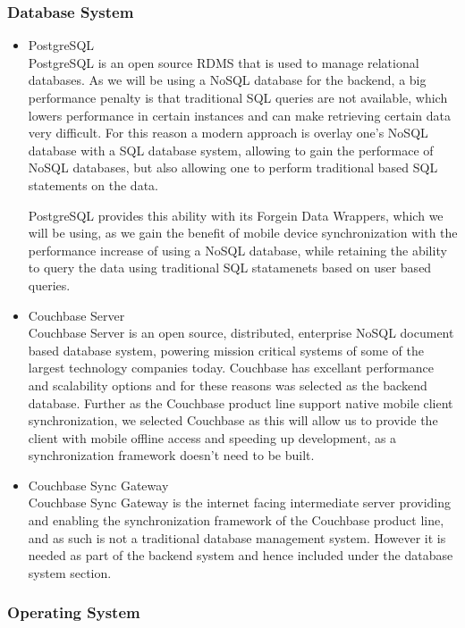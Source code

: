 \documentclass[a4paper,10pt]{article}
\begin{document}
\subsubsection{Database System}
	\begin{itemize}
		\item PostgreSQL\\
			PostgreSQL is an open source RDMS that is used to manage relational databases. As we will be using a NoSQL database for the backend, a big performance penalty is that traditional SQL queries are not available, which lowers performance in certain instances and can make retrieving certain data very difficult.  For this reason a modern approach is overlay one's NoSQL database with a SQL database system, allowing to gain the performace of NoSQL databases, but also allowing one to perform traditional based SQL statements on the data. 

			PostgreSQL provides this ability with its Forgein Data Wrappers, which we will be using, as we gain the benefit of mobile device synchronization with the performance increase of using a NoSQL database, while retaining the ability to query the data using traditional SQL statamenets based on user based queries.
		\item Couchbase Server\\
			Couchbase Server is an open source, distributed, enterprise NoSQL document based database system, powering mission critical systems of some of the largest technology companies today. Couchbase has excellant performance and scalability options and for these reasons was selected as the backend database. Further as the Couchbase product line support native mobile client synchronization, we selected Couchbase as this will allow us to provide the client  with mobile offline access and speeding up development, as a synchronization framework doesn't need to be built.
		\item Couchbase Sync Gateway\\
			Couchbase Sync Gateway is the internet facing intermediate server providing and enabling the synchronization framework of the Couchbase product line, and as such is not a traditional database management system.  However it is needed as part of the backend system and hence included under the database system section.
	\end{itemize}
\subsubsection{Operating System}
\end{document}
